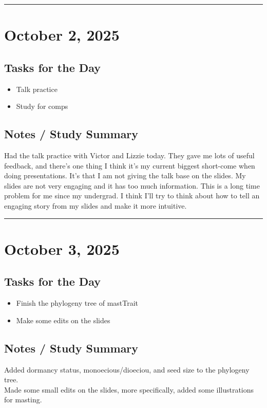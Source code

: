 \documentclass[12pt]{article}
\begin{document}
\vspace{1em}
\hrule
\vspace{1em}

\section*{October 2, 2025}

\subsection*{Tasks for the Day}
\begin{itemize}
    \item Talk practice
    \item Study for comps
\end{itemize}
\subsection*{Notes / Study Summary}
Had the talk practice with Victor and Lizzie today. They gave me lots of useful feedback, and there's one thing I think it's my current biggest short-come when doing presentations. It's that I am not giving the talk base on the slides. My slides are not very engaging and it has too much information. This is a long time problem for me since my undergrad. I think I'll try to think about how to tell an engaging story from my slides and make it more intuitive.

\vspace{1em}
\hrule
\vspace{1em}

\section*{October 3, 2025}

\subsection*{Tasks for the Day}
\begin{itemize}
    \item Finish the phylogeny tree of mastTrait
    \item Make some edits on the slides
\end{itemize}
\subsection*{Notes / Study Summary}
Added dormancy status, monoecious/dioeciou, and seed size to the phylogeny tree.\\
Made some small edits on the slides, more specifically, added some illustrations for masting.
\end{document}
